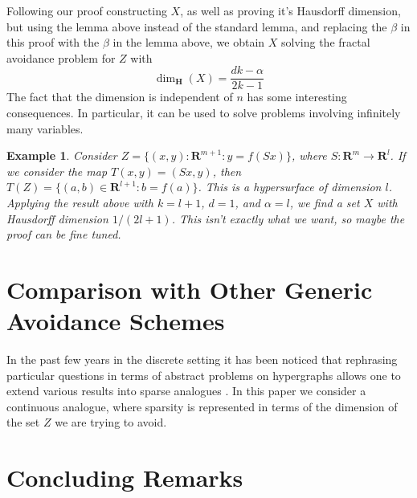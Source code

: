 \documentclass{article}
\theoremstyle{plain}
\newtheorem*{example}{Example}
\theoremstyle{plain}
\newtheorem{theorem}{Theorem}
\begin{document}
Following our proof constructing $X$, as well as proving it's Hausdorff dimension, but using the lemma above instead of the standard lemma, and replacing the $\beta$ in this proof with the $\beta$ in the lemma above, we obtain $X$ solving the fractal avoidance problem for $Z$ with
%
\[ \dim_{\mathbf{H}}(X) = \frac{dk - \alpha}{2k - 1} \]
%
The fact that the dimension is independent of $n$ has some interesting consequences. In particular, it can be used to solve problems involving infinitely many variables.

\begin{example}
	Consider $Z = \{ (x,y): \mathbf{R}^{m+1}: y = f(Sx) \}$, where $S: \mathbf{R}^m \to \mathbf{R}^l$. If we consider the map $T(x,y) = (Sx,y)$, then $T(Z) = \{ (a,b) \in \mathbf{R}^{l+1}: b = f(a) \}$. This is a hypersurface of dimension $l$. Applying the result above with $k = l+1$, $d = 1$, and $\alpha = l$, we find a set $X$ with Hausdorff dimension $1/(2l + 1)$. This isn't exactly what we want, so maybe the proof can be fine tuned.
\end{example}


\section{Comparison with Other Generic Avoidance Schemes}

In the past few years in the discrete setting it has been noticed that rephrasing particular questions in terms of abstract problems on hypergraphs allows one to extend various results into sparse analogues \cite{BaloghMorrisSamotij}. In this paper we consider a continuous analogue, where sparsity is represented in terms of the dimension of the set $Z$ we are trying to avoid.

\section{Concluding Remarks}
\end{document}
